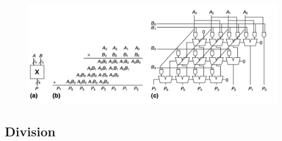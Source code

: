 \documentclass[12pt]{report}
\begin{document}
\begin{figure}[H]
  \centering
  \includegraphics[width=.9\textwidth]{multiplication-implementation.png}
\end{figure}
\pagebreak

\subsection{Division}
\end{document}
